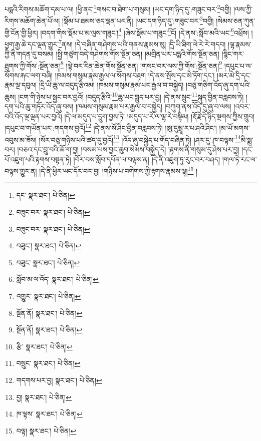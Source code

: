 པདྨའི་རིགས་མཆོག་དམ་པ་ལ། །ཕྱི་ནང་\footnote{དང་  སྣར་ཐང་།  པེ་ཅིན། }གསང་བ་ཐེག་པ་གསུམ། །ཡང་དག་ཉིད་དུ་:གཟུང་བར་\footnote{བཟུང་བར་  སྣར་ཐང་།  པེ་ཅིན། }བགྱི། །ལས་ཀྱི་རིགས་མཆོག་ཆེན་པོ་ལ། །སྡོམ་པ་ཐམས་ཅད་ལྡན་པར་ནི། །ཡང་དག་ཉིད་དུ་:གཟུང་བར་\footnote{བཟུང་བར་  སྣར་ཐང་།  པེ་ཅིན། }བགྱི། །སེམས་ཅན་ཀུན་གྱི་ངོན་གྱི་ཕྱིར། །བདག་གིས་སྡོམ་པ་མ་ལུས་གཟུང་།\footnote{བཟུང་།  སྣར་ཐང་།  པེ་ཅིན། } །ཞེས་སྡོམ་པ་གཟུང་\footnote{བཟུང་  སྣར་ཐང་།  པེ་ཅིན། }ངོ། །དེ་ནས་:སློབ་མའི་ཡང་\footnote{སློབ་མ་ལ་འོད་  སྣར་ཐང་།  པེ་ཅིན། }འཕྲོས། །ཕྱག་རྒྱ་ཆེ་དང་ལྡན་གྱུར་\footnote{འགྱུར་  སྣར་ཐང་།  པེ་ཅིན། }ནས། །དེ་བཞིན་གཤེགས་པའི་གནས་རྣམས་སུ། །དྲི་ཡི་ཐིག་ལེ་རེ་རེ་གདབ། །ལྷ་རྣམས་ཀྱི་ནི་གདན་དུ་བསམ། །སྤྱི་གཙུག་བདེ་གཤེགས་གོས་སྔོན་ཅན། །མགྲིན་པར་པདྨའི་གོས་སྔོན་ཅན། །སྙིང་གར་ཐུགས་ཀྱི་གོས་:སྔོན་ཅན།\footnote{སྔོན་ནོ།  སྣར་ཐང་།  པེ་ཅིན། } །ལྟེ་བར་རིན་ཆེན་གོས་སྔོན་ཅན། །གསང་བར་ལས་ཀྱི་གོས་:སྔོན་ཅན།\footnote{སྔོན་ནོ།  སྣར་ཐང་།  པེ་ཅིན། } །དཔུང་པ་ལ་སོགས་རྐང་ལག་བཞི། །ཁམས་གསུམ་རྣམ་རྒྱལ་ལ་སོགས་བརྟག །དེ་ནས་སྤོས་དང་མེ་ཏོག་དང་། །མར་མེ་དྲི་དང་རྣམ་ལྔ་དབུལ། །དྲི་ཡི་ཆུ་ལ་བདུད་རྩིའམ། །ཁམས་གསུམ་རྣམ་པར་རྒྱལ་བ་བསྐྱེད། །བཅུ་གཅིག་འོད་ཞུ་དག་པའི་ཆུས། །ངག་གི་ཉེས་པ་སྦྱང་བར་བྱའོ། །བདུད་རྩིའི་\footnote{རྩི་  སྣར་ཐང་།  པེ་ཅིན། }ཆུ་ཡང་བླུད་པར་བྱ། །དེ་ནས་སྲུང་\footnote{བསྲུང་  སྣར་ཐང་།  པེ་ཅིན། }སྐུད་བྱིན་བརླབས་ཏེ། །དག་པའི་ཆུ་གཏོར་འོད་ཞུ་བས། །ཁམས་གསུམ་རྣམ་པར་རྒྱལ་བ་བསྐྱེད། །བཀུག་ནས་འོད་དུ་ཞུ་བ་ལས། །འབར་བའི་འོད་ལྔ་ལྡན་པར་བྱའོ། །དེ་ལ་མདུད་པ་དྲུག་བྱས་ཏེ། །མདུད་པ་རེ་ལ་ལྷ་རེ་བསྟིམ། །རྡོ་རྗེ་དེ་ཉིད་སྔགས་ཀྱིས་གྲུབ། །དཔུང་བ་གཡོན་པར་:གདགས་བྱའོ།\footnote{གདགས་པར་བྱ།  སྣར་ཐང་།  པེ་ཅིན། } །དེ་ནས་སོ་ཤིང་བྱིན་བརླབས་ཏེ། །ཨུ་དུམྦཱ་ར་པ་ཤའི་ཤིང་། །མ་ཡོ་མགས་འབུས་མ་ཟོས། །སོར་བཅུ་གཉིས་པའི་ཚད་དུ་བྱའོ།\footnote{བྱ།  སྣར་ཐང་།  པེ་ཅིན། } །འོད་ཞུ་བསྐྱེད་པ་གོད་བཞིན་ཏེ། །ཤར་དུ་:ཁ་བལྟས་\footnote{ཁ་ལྟས་  སྣར་ཐང་།  པེ་ཅིན། }མི་སྨྲ་བར། །བཅའ་དང་བྲུ་བའི་ཆོ་ག་བྱ། །བསམ་པས་བྱང་ཆུབ་སེམས་བསྐྱེད་དེ། །རྟགས་ནི་གསུམ་དུ་ཤེས་པར་བྱ། །དང་པོ་འཇུག་པའི་རྟགས་བསྟན་ཏེ། །བོར་བས་སློབ་དཔོན་ལ་བལྟས་ན། །དེ་ནི་འཇུག་ཏུ་རུང་བར་བཤད། །གལ་ཏེ་རང་ལ་བལྟས་གྱུར་ན། །དེ་ནི་ཕྱིར་ཡང་དོར་བར་བྱ། །གཉིས་པ་བགེགས་ཀྱི་རྟགས་རྣམས་ལྟ།\footnote{བལྟ།  སྣར་ཐང་།  པེ་ཅིན། } །
